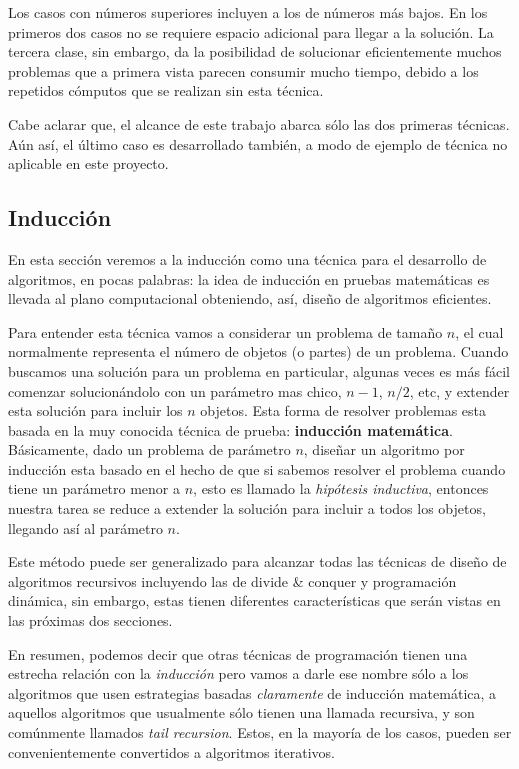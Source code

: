 Los casos con números superiores incluyen a los de números más bajos. En los primeros dos casos no se requiere espacio adicional para llegar
a la solución. La tercera clase, sin embargo, da la posibilidad de solucionar eficientemente muchos problemas que a primera vista parecen
consumir mucho tiempo, debido a los repetidos cómputos que se realizan sin esta técnica\cite{alsuwaiyel98}.

Cabe aclarar que, el alcance de este trabajo abarca sólo las dos primeras técnicas. Aún así, el último caso es desarrollado también, a
modo de ejemplo de técnica no aplicable en este proyecto.

\subsection{Inducción}

En esta sección veremos a la inducción como una técnica para el desarrollo de algoritmos, en pocas palabras: la idea de inducción en pruebas
matemáticas es llevada al plano computacional obteniendo, así, diseño de algoritmos eficientes.

Para entender esta técnica vamos a considerar un problema de tamaño $n$, el cual normalmente representa el número de objetos (o partes) de
un problema. Cuando buscamos una solución para un problema en particular, algunas veces es más fácil comenzar solucionándolo con un
parámetro mas chico, $n-1$, $n/2$, etc, y extender esta solución para incluir los $n$ objetos. Esta forma de resolver problemas esta basada
en la muy conocida técnica de prueba: \textbf{inducción matemática}. Básicamente, dado un problema de parámetro $n$, diseñar un algoritmo
por inducción esta basado en el hecho de que si sabemos resolver el problema cuando tiene un parámetro menor a $n$, esto es llamado la
\textit{hipótesis inductiva}, entonces nuestra tarea se reduce a extender la solución para incluir a todos los objetos, llegando así al
parámetro $n$.

Este método puede ser generalizado para alcanzar todas las técnicas de diseño de algoritmos recursivos incluyendo las de divide \& conquer y
programación dinámica, sin embargo, estas tienen diferentes características que serán vistas en las próximas dos secciones.

En resumen, podemos decir que otras técnicas de programación tienen una estrecha relación con la \textit{inducción} pero vamos a darle ese
nombre sólo a los algoritmos que usen estrategias basadas \textit{claramente} de inducción matemática, a aquellos algoritmos que usualmente
sólo tienen una llamada recursiva, y son comúnmente llamados \textit{tail recursion}. Estos, en la mayoría de los casos, pueden ser
convenientemente convertidos a algoritmos iterativos.

